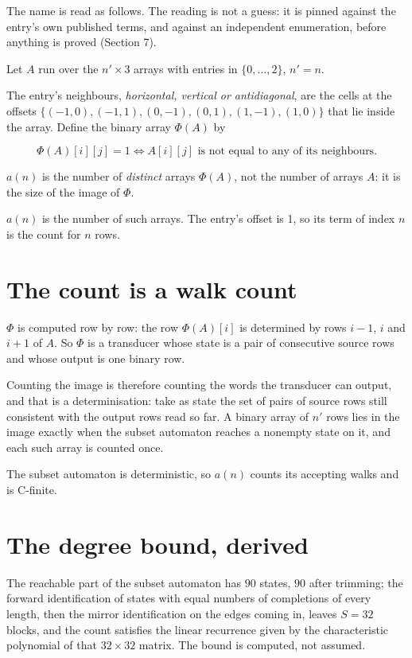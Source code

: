 \documentclass[11pt]{article}
\theoremstyle{definition}
\begin{document}
The name is read as follows. The reading is not a guess: it is pinned against the entry's own published terms, and against an independent enumeration, before anything is proved (Section 7).

Let $A$ run over the $n' \times 3$ arrays with entries in $\{0,\dots,2\}$, $n' = n$.

The entry's neighbours, {\itshape horizontal, vertical or antidiagonal}, are the cells at the offsets $\{(-1,0), (-1,1), (0,-1), (0,1), (1,-1), (1,0)\}$ that lie inside the array. Define the binary array $\Phi(A)$ by

\[\Phi(A)[i][j] = 1 \iff A[i][j] \text{ is not equal to any of its neighbours}.\]

$a(n)$ is the number of {\itshape distinct} arrays $\Phi(A)$, not the number of arrays $A$: it is the size of the image of $\Phi$.

$a(n)$ is the number of such arrays. The entry's offset is 1, so its term of index $n$ is the count for $n$ rows.

\section{The count is a walk count}

$\Phi$ is computed row by row: the row $\Phi(A)[i]$ is determined by rows $i-1$, $i$ and $i+1$ of $A$. So $\Phi$ is a transducer whose state is a pair of consecutive source rows and whose output is one binary row.

Counting the image is therefore counting the words the transducer can output, and that is a determinisation: take as state the set of pairs of source rows still consistent with the output rows read so far. A binary array of $n'$ rows lies in the image exactly when the subset automaton reaches a nonempty state on it, and each such array is counted once.

The subset automaton is deterministic, so $a(n)$ counts its accepting walks and is C-finite.

\section{The degree bound, derived}

The reachable part of the subset automaton has $90$ states, $90$ after trimming; the forward identification of states with equal numbers of completions of every length, then the mirror identification on the edges coming in, leaves $S = 32$ blocks, and the count satisfies the linear recurrence given by the characteristic polynomial of that $32\times32$ matrix. The bound is computed, not assumed.
\end{document}
